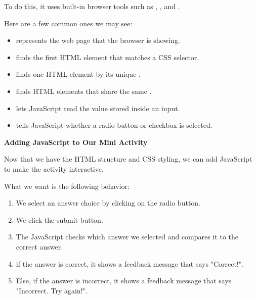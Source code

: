 \documentclass{article}
\begin{document}
To do this, it uses built-in browser tools such as , , and .

\vspace{0.2cm}

Here are a few common ones we may see:

\begin{itemize}
  \item {} represents the web page that the browser is showing.
  \item {} finds the first HTML element that matches a CSS selector.
  \item {} finds one HTML element by its unique .
  \item {} finds HTML elements that share the same .
  \item {} lets JavaScript read the value stored inside an input.
  \item {} tells JavaScript whether a radio button or checkbox is selected.
\end{itemize}

\vspace{0.2cm}

\vspace{0.3cm}

\textbf{\Bitter\textcolor{naranja}{Adding JavaScript to Our Mini Activity}}

\vspace{0.1cm}

Now that we have the HTML structure and CSS styling, we can add JavaScript to make the activity interactive.

What we want is the following behavior:
\begin{enumerate}
  \item We select an answer choice by clicking on the radio button.
  \item We click the submit button.
  \item The JavaScript checks which answer we selected and compares it to the correct answer.
  \item if the answer is correct, it shows a feedback message that says "Correct!".
  \item Else, if the answer is incorrect, it shows a feedback message that says "Incorrect. Try again!".
\end{enumerate}
\end{document}
